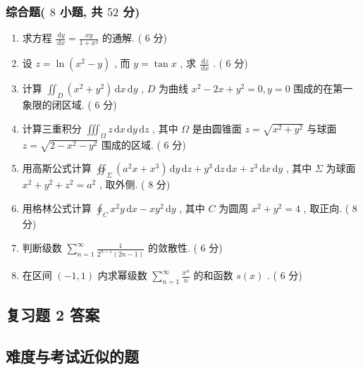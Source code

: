 \documentclass[cn,11pt,fancy,hide]{elegantbook}
\newcommand{\dd}{\,\mathrm{d}}
\begin{document}
\subsubsection{综合题( $8$ 小题, 共 $52$ 分)}
\begin{enumerate}
	\item 求方程 $\frac{\dd y}{\dd x}=\frac{x y}{1+x^{2}}$ 的通解. ( $6$ 分)
	
	\item 设 $z=\ln \left(x^{2}-y\right)$ , 而 $y=\tan x$ , 求 $\frac{\dd z}{\dd x}$ . ( $6$ 分)
	
	\item 计算 $\iint_{D}\left(x^{2}+y^{2}\right) \dd x \dd y$ , $D$ 为曲线 $x^{2}-2 x+y^{2}=0, y=0$ 围成的在第一象限的闭区域. ( $6$ 分)
	
	\item 计算三重积分 $\iiint_{\Omega} z \dd x \dd y \dd z$ , 其中 $\Omega$ 是由圆锥面 $z=\sqrt{x^{2}+y^{2}}$ 与球面 $z=\sqrt{2-x^{2}-y^{2}}$ 围成的区域. ( $6$ 分)
	
	\item 用高斯公式计算 $\oiint_{\Sigma}\left(a^{2} x+x^{3}\right) \dd y \dd z+y^{3} \dd z \dd x+z^{3} \dd x \dd y$ , 其中 $\Sigma$ 为球面 $x^{2}+y^{2}+z^{2}=a^{2}$ , 取外侧. ( $8$ 分)
	
	\item 用格林公式计算 $\oint_{C} x^{2} y \dd x-x y^{2} \dd y$ , 其中 $C$ 为圆周 $x^2+y^2=4$ , 取正向. ( $8$ 分)
	
	\item 判断级数 $\sum_{n=1}^{\infty} \frac{1}{2^{n-1}(2 n-1)}$ 的敛散性. ( $6$ 分)
	
	\item 在区间 $(-1,1)$ 内求幂级数 $\sum_{n=1}^{\infty} \frac{x^{n}}{n}$ 的和函数 $s(x)$ . ( $6$ 分)
\end{enumerate}


\subsection{复习题 2 答案}


\subsection{难度与考试近似的题}
\end{document}
